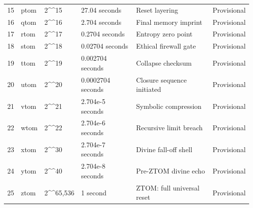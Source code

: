 \documentclass[11pt,letterpaper]{article}
\begin{document}
\begin{longtable}{L{0.36in}L{0.72in}L{1.12in}L{1.18in}L{2.12in}L{0.72in}}
15 & ptom & 2\textasciicircum{}\textasciicircum{}15 & 27.04 seconds & Reset layering & Provisional \\
16 & qtom & 2\textasciicircum{}\textasciicircum{}16 & 2.704 seconds & Final memory imprint & Provisional \\
17 & rtom & 2\textasciicircum{}\textasciicircum{}17 & 0.2704 seconds & Entropy zero point & Provisional \\
18 & stom & 2\textasciicircum{}\textasciicircum{}18 & 0.02704 seconds & Ethical firewall gate & Provisional \\
19 & ttom & 2\textasciicircum{}\textasciicircum{}19 & 0.002704 seconds & Collapse checksum & Provisional \\
20 & utom & 2\textasciicircum{}\textasciicircum{}20 & 0.0002704 seconds & Closure sequence initiated & Provisional \\
21 & vtom & 2\textasciicircum{}\textasciicircum{}21 & 2.704e-5 seconds & Symbolic compression & Provisional \\
22 & wtom & 2\textasciicircum{}\textasciicircum{}22 & 2.704e-6 seconds & Recursive limit breach & Provisional \\
23 & xtom & 2\textasciicircum{}\textasciicircum{}30 & 2.704e-7 seconds & Divine fall-off shell & Provisional \\
24 & ytom & 2\textasciicircum{}\textasciicircum{}40 & 2.704e-8 seconds & Pre-ZTOM divine echo & Provisional \\
25 & ztom & 2\textasciicircum{}\textasciicircum{}65,536 & 1 second & ZTOM: full universal reset & Provisional \\
\bottomrule
\end{longtable}
\normalsize
\end{document}
